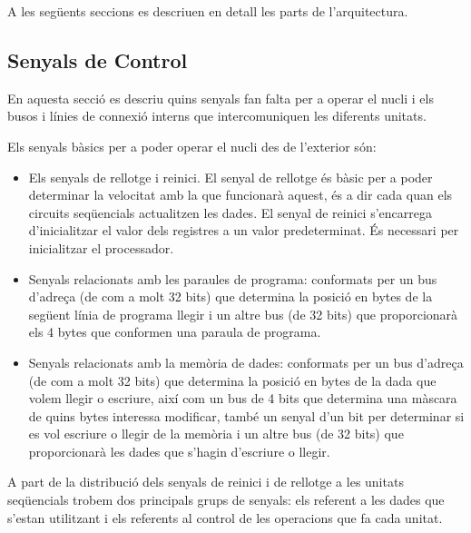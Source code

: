 \documentclass[10pt,a4paper,twocolumn,twoside]{article}
\begin{document}
    A les següents seccions es descriuen en detall les parts de l'arquitectura.
    \subsection{Senyals de Control}
    En aquesta secció es descriu quins senyals fan falta per a operar el nucli i els busos i línies de connexió interns que intercomuniquen les diferents unitats.
        
        Els senyals bàsics per a poder operar el nucli des de l'exterior són:
        \begin{itemize}
            \item Els senyals de rellotge i reinici. El senyal de rellotge és bàsic per a poder determinar la velocitat amb la que funcionarà aquest, és a dir cada quan els circuits seqüencials actualitzen les dades. El senyal de reinici s’encarrega d’inicialitzar el valor dels registres a un valor predeterminat. És necessari per inicialitzar el processador. 
            \item Senyals relacionats amb les paraules de programa: conformats per un bus d'adreça (de com a molt 32 bits) que determina la posició en bytes de la següent línia de programa llegir i un altre bus (de 32 bits) que proporcionarà els 4 bytes que conformen una paraula de programa.
            \item Senyals relacionats amb la memòria de dades: conformats per un bus d'adreça (de com a molt 32 bits) que determina la posició en bytes de la dada que volem llegir o escriure, així com un bus de 4 bits que determina una màscara de quins bytes interessa modificar, també un senyal d'un bit per determinar si es vol escriure o llegir de la memòria i un altre bus (de 32 bits) que proporcionarà les dades que s'hagin d'escriure o llegir.
        \end{itemize}
        
        A part de la distribució dels senyals de reinici i de rellotge a les unitats seqüencials trobem dos principals grups de senyals: els referent a les dades que s'estan utilitzant i els referents al control de les operacions que fa cada unitat.
        
\end{document}
